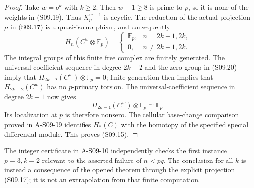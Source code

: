 \begin{proof}
Take $w=p^k$ with $k\geq2$.  Then $w-1\geq8$ is prime
to $p$, so it is none of the weights in (S09.19).  Thus
$K_p^{w-1}$ is acyclic.  The reduction of the actual projection
$\rho$ in (S09.17) is a quasi-isomorphism, and consequently
\[
 H_n(C^w\otimes\mathbb F_p)=
 \begin{cases}
  \mathbb F_p,&n=2k-1,2k,\\
  0,&n\ne2k-1,2k.
 \end{cases}
 \tag{S09.20}
\]
The integral groups of this finite free complex are finitely
generated.  The universal-coefficient sequence in degree
$2k-2$ and the zero group in (S09.20) imply that
$H_{2k-2}(C^w)\otimes\mathbb F_p=0$; finite generation
then implies that $H_{2k-2}(C^w)$ has no $p$-primary torsion.
The universal-coefficient sequence in degree $2k-1$ now gives
\[
 H_{2k-1}(C^w)\otimes\mathbb F_p\cong\mathbb F_p.
\]
Its localization at $p$ is therefore nonzero.  The cellular
base-change comparison proved in A-S09-09 identifies
$H_*(C)$ with the homotopy of the specified special differential
module.  This proves (S09.15).
\end{proof}

The integer certificate in A-S09-10 independently checks the
first instance $p=3,k=2$ relevant to the asserted failure
of $n<pq$.  The conclusion for all $k$ is instead a consequence
of the opened theorem through the explicit projection
(S09.17); it is not an extrapolation from that finite computation.
